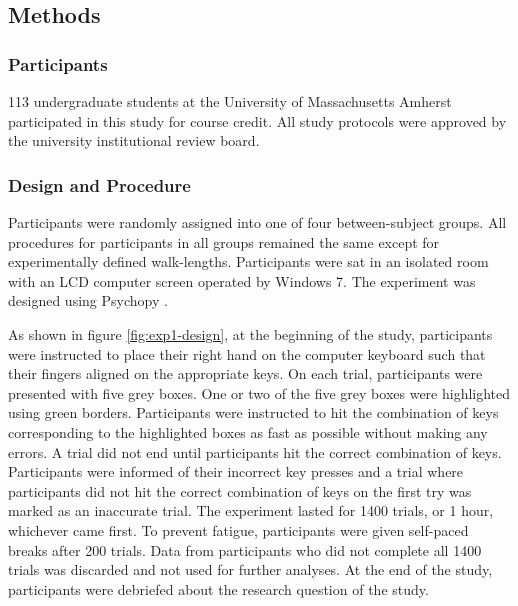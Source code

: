\subsection{Methods}

\subsubsection*{Participants}
113 undergraduate students at the University of Massachusetts Amherst participated in this study for course credit. All study protocols were approved by the university institutional review board. 

\subsubsection*{Design and Procedure}
Participants were randomly assigned into one of four between-subject groups. All procedures for participants in all groups remained the same except for experimentally defined walk-lengths. Participants were sat in an isolated room with an LCD computer screen operated by Windows 7. The experiment was designed using Psychopy \cite{peirce2007psychopy}. 

As shown in figure \ref{fig:exp1-design}, at the beginning of the study, participants were instructed to place their right hand on the computer keyboard such that their fingers aligned on the appropriate keys. On each trial, participants were presented with five grey boxes. One or two of the five grey boxes were highlighted using green borders. Participants were instructed to hit the combination of keys corresponding to the highlighted boxes as fast as possible without making any errors. A trial did not end until participants hit the correct combination of keys. Participants were informed of their incorrect key presses and a trial where participants did not hit the correct combination of keys on the first try was marked as an inaccurate trial. The experiment lasted for 1400 trials, or 1 hour, whichever came first. To prevent fatigue, participants were given self-paced breaks after 200 trials. Data from participants who did not complete all 1400 trials was discarded and not used for further analyses. At the end of the study, participants were debriefed about the research question of the study.

